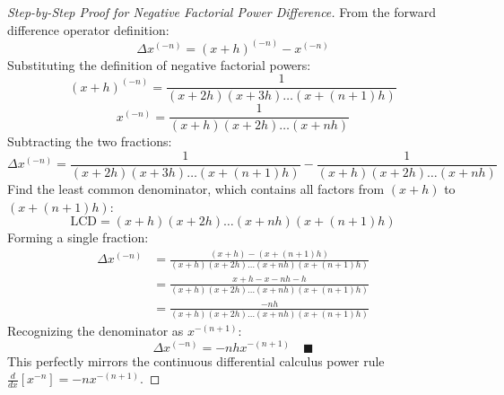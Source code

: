 \begin{proof}[Step-by-Step Proof for Negative Factorial Power Difference]
From the forward difference operator definition:
\begin{equation}
    \Delta x^{(-n)} = (x + h)^{(-n)} - x^{(-n)}
\end{equation}
Substituting the definition of negative factorial powers:
\begin{equation}
    (x + h)^{(-n)} = \frac{1}{(x + 2h)(x + 3h)\dots(x + (n+1)h)}
\end{equation}
\begin{equation}
    x^{(-n)} = \frac{1}{(x + h)(x + 2h)\dots(x + nh)}
\end{equation}
Subtracting the two fractions:
\begin{equation}
    \Delta x^{(-n)} = \frac{1}{(x + 2h)(x + 3h)\dots(x + (n+1)h)} - \frac{1}{(x + h)(x + 2h)\dots(x + nh)}
\end{equation}
Find the least common denominator, which contains all factors from $(x+h)$ to $(x+(n+1)h)$:
\begin{equation}
    \text{LCD} = (x + h)(x + 2h)\dots(x + nh)(x + (n+1)h)
\end{equation}
Forming a single fraction:
\begin{align}
    \Delta x^{(-n)} &= \frac{(x + h) - (x + (n+1)h)}{(x + h)(x + 2h)\dots(x + nh)(x + (n+1)h)} \nonumber \\
    &= \frac{x + h - x - nh - h}{(x + h)(x + 2h)\dots(x + nh)(x + (n+1)h)} \nonumber \\
    &= \frac{-nh}{(x + h)(x + 2h)\dots(x + nh)(x + (n+1)h)}
\end{align}
Recognizing the denominator as $x^{-(n+1)}$:
\begin{equation}
    \boxed{\Delta x^{(-n)} = -n h x^{-(n+1)}} \quad \blacksquare
\end{equation}
This perfectly mirrors the continuous differential calculus power rule $\frac{d}{dx}[x^{-n}] = -n x^{-(n+1)}$.
\end{proof}



